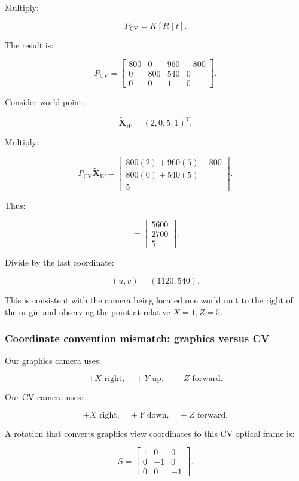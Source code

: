 Multiply:

\[
 P_{\mathrm{CV}}= K[R\mid t].
\]

The result is:

\[
 \boxed{ P_{\mathrm{CV}}= \begin{bmatrix} 800&0&960&-800\\ 0&800&540&0\\ 0&0&1&0 \end{bmatrix} }.
\]

Consider world point:

\[
 \tilde{\mathbf X}_W=(2,0,5,1)^T.
\]

Multiply:

\[
 P_{\mathrm{CV}}\tilde{\mathbf X}_W = \begin{bmatrix} 800(2)+960(5)-800\\ 800(0)+540(5)\\ 5 \end{bmatrix}.
\]

Thus:

\[
 = \begin{bmatrix} 5600\\2700\\5 \end{bmatrix}.
\]

Divide by the last coordinate:

\[
 \boxed{ (u,v)=(1120,540) }.
\]

This is consistent with the camera being located one world unit to the right of the origin and observing the point at relative \(X=1,Z=5\).

\subsubsection{Coordinate convention mismatch: graphics versus CV}\label{coordinate-convention-mismatch-graphics-versus-cv}

Our graphics camera uses:

\[
 +X\text{ right},\quad+Y\text{ up},\quad-Z\text{ forward}.
\]

Our CV camera uses:

\[
 +X\text{ right},\quad+Y\text{ down},\quad+Z\text{ forward}.
\]

A rotation that converts graphics view coordinates to this CV optical frame is:

\[
 \boxed{ S= \begin{bmatrix} 1&0&0\\ 0&-1&0\\ 0&0&-1 \end{bmatrix} }.
\]

